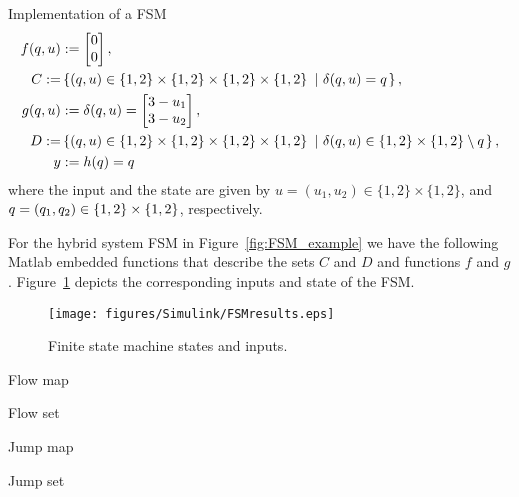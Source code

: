 \begin{example}{Implementation of a FSM}
\begin{align}\label{eqn:CTdynamicsHcFSM}
f(\xlogic, u)&:= \begin{bmatrix}0\\0\end{bmatrix},\\ 
   C :=& \defset{(\xlogic,u)\in\{1,2\}\times\{1,2\}\times\{1,2\}\times\{1,2\}}{ \delta(\xlogic,u) =  \xlogic},\\
g(\xlogic, u)&:= \delta(\xlogic, u) = \begin{bmatrix}3-u_1\\3-u_2\end{bmatrix}, \\
    D :=& \defset{(\xlogic,u)\in\{1,2\}\times\{1,2\}\times\{1,2\}\times\{1,2\}}{ \delta(\xlogic,u) \in\{1,2\}\times\{1,2\}\setminus \xlogic},\\ 
y &:= h(\xlogic) =\xlogic
\end{align}
where the input and the state are given by $u = (u_1,u_2) \in\{1,2\}\times\{1,2\}$, and $q=(q_1,q_2)\in\{1,2\}\times\{1,2\}$, respectively.

For the hybrid system FSM in Figure~\ref{fig:FSM_example} we have the following Matlab embedded functions that describe the sets $C$ and $D$ and functions $f$ and $g$.
Figure~\ref{fig:FSMresults} depicts the corresponding inputs and state of the FSM.

\begin{figure}[ht]
  \begin{center}
    \texttt{[image: figures/Simulink/FSMresults.eps]}
   \caption{Finite state machine states and inputs.}
\label{fig:FSMresults}
  \end{center}
\end{figure}



Flow map
\label{scr:f}

Flow set
\label{scr:C}

Jump map
\label{scr:g}

Jump set
\label{scr:D}


\end{example}
